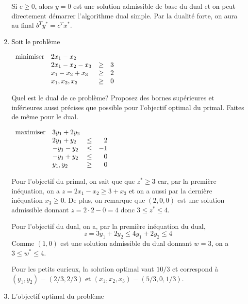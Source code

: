 \begin{enumerate}
\begin{solution}
      Si $c \geq 0$, alors $y=0$ est une solution admissible de base du dual et on peut directement démarrer l'algorithme dual simple. Par la dualité forte, on aura au final $b^{T}y^{*} = c^{T}x^{*}$.
    \end{solution}

  \item Soit le problème

    $
    \begin{array}{llcr}
      \mbox{minimiser} & 2x_1-x_2\\
      & 2x_1-x_2 -x_3 & \geq & 3\\
      & x_1-x_2 +x_3 & \geq & 2\\
      & x_1, x_2, x_3 & \geq & 0
    \end{array}
    $

    Quel est le dual de ce problème?
    Proposez des bornes supérieures et inférieures aussi précises que possible pour l'objectif optimal du primal.
    Faites de même pour le dual.

    \begin{solution}

      $
      \begin{array}{llcr}
        \mbox{maximiser} & 3y_1 + 2y_2\\
        & 2y_1 + y_2 & \leq & 2\\
        & -y_1 - y_2 & \leq & -1\\
        & -y_1 + y_2 & \leq & 0\\
        & y_1, y_2 & \geq & 0
      \end{array}
      $

      Pour l'objectif du primal, on sait que que $z^* \geq 3$ car,
      par la première inéquation, on a $z = 2x_1 - x_2 \geq 3 + x_3$ et on
      a aussi par la dernière inéquation $x_3 \geq 0$.
      De plus, on remarque que $(2, 0, 0)$ est une solution admissible donnant
      $z = 2\cdot 2 - 0 = 4$ donc $3 \leq z^* \leq 4$.

      Pour l'objectif du dual, on a, par la première inéquation du dual,
      $$ z = 3y_1 + 2y_2 \leq 4y_1 + 2y_2 \leq 4 $$
      Comme $(1, 0)$ est une solution admissible du dual donnant $w = 3$,
      on a $3 \leq w^* \leq 4$.

      Pour les petits curieux, la solution optimal vaut $10/3$ et correspond
      à $(y_1, y_2) = (2/3, 2/3)$ et $(x_1, x_2, x_3) = (5/3, 0, 1/3)$.
    \end{solution}

  \item L'objectif optimal du problème


\end{enumerate}
